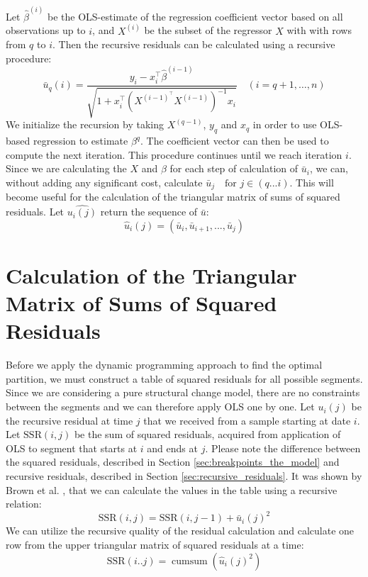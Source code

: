 \documentclass[main.tex]{subfiles}
\begin{document}
Let $\hat{\beta}^{(i)}$ be the OLS-estimate of the regression coefficient
vector based on all observations up to $i$, and $X^{(i)}$ be the subset of the
regressor $X$ with with rows from $q$ to $i$. Then the recursive residuals can
be calculated using a recursive procedure:
\[
\bar{u}_{q}(i)=\frac{y_{i}-x_{i}^{\top}
  \hat{\beta}^{(i-1)}}{\sqrt{1+x_{i}^{\top}\left(X^{(i-1)^{\top}}
    X^{(i-1)}\right)^{-1} x_{i}}} \quad(i=q+1, \ldots, n)
\]
We initialize the recursion by taking $X^{(q-1)}$, $y_{q}$ and $x_{q}$ in order to
use OLS-based regression to estimate $\beta^{q}$. The coefficient vector can
then be used to compute the next iteration. This procedure continues until we
reach iteration $i$. Since we are calculating the $X$ and $\beta$
for each step of calculation of $\bar{u}_i$, we can, without adding any
significant cost, calculate $\bar{u}_j \quad \text{for } j \in (q...i)$. This
will become useful for the calculation of the triangular matrix of sums of
squared residuals. Let $\hat{u_i(j)}$ return the sequence of $\bar{u}$:
\[\hat{u}_i(j) = (\bar{u}_i, \bar{u}_{i+1}, ..., \bar{u}_j)\]


\section{Calculation of the Triangular Matrix of Sums of Squared Residuals}
\label{sec:triangular_matrix}
Before we apply the dynamic programming approach to find the optimal
partition, we must construct a table of squared residuals for all possible
segments. Since we are considering a pure
structural change model, there are no constraints between the segments and we
can therefore apply OLS one by one. Let $u_i(j)$ be the recursive residual at
time $j$ that we received from a sample starting at date $i$.
Let $\text{SSR}(i, j)$  be the sum of squared residuals, acquired from
application of OLS to segment that starts at $i$ and ends at $j$.
Please note the difference between the squared residuals, described in Section
\ref{sec:breakpoints_the_model} and recursive residuals, described in Section
\ref{sec:recursive_residuals}. 
It was shown by Brown et al. \cite{brown75}, that we can calculate the values in
the table using a recursive relation:
\[
\text{SSR}(i,j) = \text{SSR}(i, j - 1) + \bar{u}_i(j)^2
\]
We can utilize the recursive quality of the residual calculation and calculate
one row from the upper triangular matrix of squared residuals at a time:
\[
\text{SSR}(i..j) = \operatorname{cumsum}(\hat{u}_i(j)^2)
\]
\end{document}
